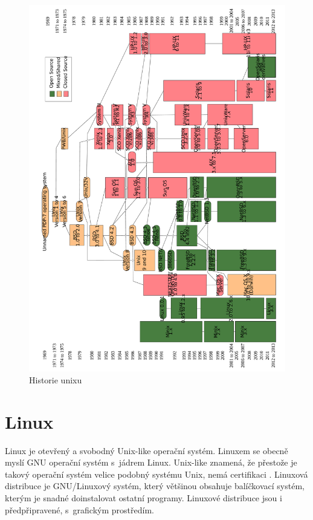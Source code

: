 \documentclass[thesis=M,czech]{FITthesis}[2012/06/26]
\begin{document}
\begin{figure}
	\includegraphics[width=1.0\textwidth]{./images/Unix_history-simple_rot_big}
	\caption{Historie unixu \cite{unixhistorysvg}}
	\label{fig:unixhistory}
\end{figure}



\section{Linux}
Linux \cite{linux} je otevřený a svobodný Unix-like operační systém. Linuxem se obecně myslí GNU operační systém s~jádrem Linux. Unix-like znamená, že přestože je takový operační systém velice podobný systému Unix, nemá certifikaci . Linuxová distribuce je GNU/Linuxový systém, který většinou obsahuje balíčkovací systém, kterým je snadné doinstalovat ostatní programy. Linuxové distribuce jsou i předpřipravené, s~grafickým prostředím.
\end{document}
